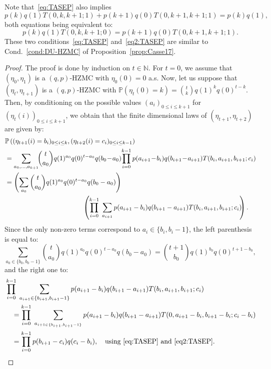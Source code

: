 \documentclass[10pt]{amsart}
\theoremstyle{definition}\newtheorem{defi}[theo]{Definition}\newtheorem{rema}[theo]{Remark}\newtheorem{exam}[theo]{Example}\newtheorem{exem}[theo]{Example}\newtheorem{nota}[theo]{Notation}
\newcounter{a}
\newcommand{\Cond}{Cond.}
\newcommand{\NN}{\mathbb{N}}
\newcommand{\Pbb}{\mathbb{P}}
\begin{document}
Note that~\eqref{eq:TASEP} also implies
\begin{equation}\label{eq2:TASEP}
p(k) q(1) T(0,k,k+1;1) + p(k+1) q(0) T(0,k+1,k+1;1) = p(k)q(1),
\end{equation}
both equations being equivalent to:
\begin{equation}\label{eqequiv:TASEP}
p(k) q(1) T(0,k,k+1;0) = p(k+1) q(0) T(0,k+1,k+1;1).
\end{equation}
These two conditions~\eqref{eq:TASEP} and~\eqref{eq2:TASEP} are similar to \Cond~\ref{cond:DU-HZMC} of Proposition~\ref{prop:Casse17}.

\begin{proof}
The proof is done by induction on $t\in\NN$. For $t=0$, we assume that $(\eta_0,\eta_1)$ is a $(q,p)$-HZMC with $\eta_0(0)=0$ a.s.
Now, let us suppose that $(\eta_t,\eta_{t+1})$ is a $(q,p)$-HZMC with $ \Pbb\left(\eta_t(0) = k\right) = \binom{t}{k} q(1)^k q(0)^{t-k}$. Then, by conditioning on the possible values $(a_i)_{0 \leq i \leq k+1}$ for $(\eta_t(i))_{0 \leq i \leq k+1}$, we obtain that the finite dimensional laws of $(\eta_{t+1},\eta_{t+2})$ are given by:
\begin{align*}
& \Pbb\left((\eta_{t+1}(i)=b_i)_{0 \leq i \leq k},(\eta_{t+2}(i)=c_i)_{0 \leq i \leq k-1}\right)\\
&= \sum_{a_0,\dots,a_{k+1}}\!\!\binom{t}{a_0} q(1)^{a_0} q(0)^{t-a_0} q(b_0\!-\!a_0)\!\prod_{i=0}^{k-1} p(a_{i+1}\!-\!b_i) q(b_{i+1}\!-\!a_{i+1}) T(b_i,a_{i+1},b_{i+1};c_i) \\
&= \left(\sum_{a_0 } \binom{t}{a_0} q(1)^{a_0} q(0)^{t-a_0} q(b_0-a_0)\right) \\
&\mkern 210mu \left(\prod_{i=0}^{k-1} \; \sum_{a_{i+1} } p(a_{i+1}-b_i) q(b_{i+1}-a_{i+1}) T(b_i,a_{i+1},b_{i+1};c_i)\!\!\right).
\end{align*}
Since the only non-zero terms correspond to $a_i\in\{b_i,b_i-1\}$, the left parenthesis is equal to:
\[
\sum_{a_0\in\{b_0,b_0-1\}} \binom{t}{a_0} q(1)^{a_0} q(0)^{t-a_0} q(b_0-a_0)=\binom{t+1}{b_0} q(1)^{b_0} q(0)^{t+1-b_0},
\]
and the right one to:
\begin{align*}
&\prod_{i=0}^{k-1} \; \sum_{a_{i+1}\in\{b_{i+1},b_{i+1}-1\}} p(a_{i+1}-b_i) q(b_{i+1}-a_{i+1}) T(b_i,a_{i+1},b_{i+1};c_i)\\
&\quad=\prod_{i=0}^{k-1} \; \sum_{a_{i+1\in\{b_{i+1},b_{i+1}-1\}}} p(a_{i+1}-b_i) q(b_{i+1}-a_{i+1}) T(0,a_{i+1}-b_i,b_{i+1}-b_i;c_i-b_i) \\
&\quad=\prod_{i=0}^{k-1} p(b_{i+1}-c_i) q(c_i-b_i), \quad \text{using~\eqref{eq:TASEP} and~\eqref{eq2:TASEP}}.\qedhere
\end{align*}
\end{proof}
\end{document}
